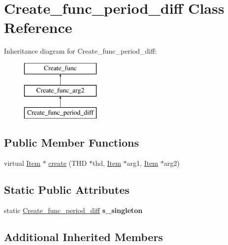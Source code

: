 \hypertarget{classCreate__func__period__diff}{}\section{Create\+\_\+func\+\_\+period\+\_\+diff Class Reference}
\label{classCreate__func__period__diff}
Inheritance diagram for Create\+\_\+func\+\_\+period\+\_\+diff\+:\begin{figure}[H]
\begin{center}
\leavevmode
\includegraphics[height=3.000000cm]{classCreate__func__period__diff}
\end{center}
\end{figure}
\subsection*{Public Member Functions}
\begin{DoxyCompactItemize}
\item 
virtual \mbox{\hyperlink{classItem}{Item}} $\ast$ \mbox{\hyperlink{classCreate__func__period__diff_a21eace0c8087f4739b71e2ef504fbb1a}{create}} (T\+HD $\ast$thd, \mbox{\hyperlink{classItem}{Item}} $\ast$arg1, \mbox{\hyperlink{classItem}{Item}} $\ast$arg2)
\end{DoxyCompactItemize}
\subsection*{Static Public Attributes}
\begin{DoxyCompactItemize}
\item 
\mbox{\label{classCreate__func__period__diff_a0e85ed1cb37e554755bda54f41b85c67}} 
static \mbox{\hyperlink{classCreate__func__period__diff}{Create\+\_\+func\+\_\+period\+\_\+diff}} {\bfseries s\+\_\+singleton}
\end{DoxyCompactItemize}
\subsection*{Additional Inherited Members}


